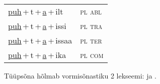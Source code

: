\begin{minipage}{\textwidth}
\begin{sideways}
\begin{tabular}{l l}
\underline{puh}\,+\,t\,+\,\underline{a}\,+\,ilt & \textsc{ pl abl } \\
\underline{puh}\,+\,t\,+\,\underline{a}\,+\,issi & \textsc{ pl tra } \\
\underline{puh}\,+\,t\,+\,\underline{a}\,+\,issaa & \textsc{ pl ter } \\
\underline{puh}\,+\,t\,+\,\underline{a}\,+\,ika & \textsc{ pl com } \\
\end{tabular}
\end{sideways}
\label{tab:tüüpsõnamall-puhaz}

\end{minipage}

 
\vspace{1em}
\noindent Tüüpsõna hõlmab vormisõnastiku 2 lekseemi:  ja .
